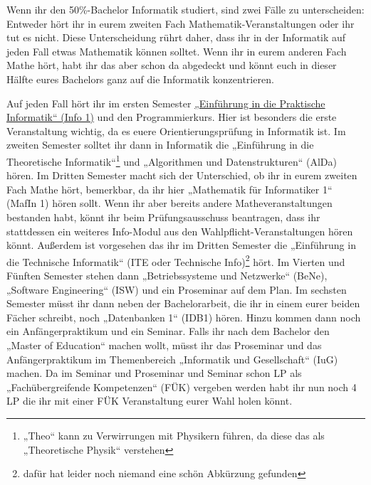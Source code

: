\newpage{}

Wenn ihr den 50\%-Bachelor Informatik studiert, sind zwei Fälle zu unterscheiden: Entweder hört ihr in eurem zweiten Fach Ma\-the\-ma\-tik-Ver\-an\-stal\-tun\-gen oder ihr tut es nicht. Diese Unterscheidung rührt daher, dass ihr in der Informatik auf jeden Fall etwas Mathematik können solltet. Wenn ihr in eurem anderen Fach Mathe hört, habt ihr das aber schon da abgedeckt und könnt euch in dieser Hälfte eures Bachelors ganz auf die Informatik konzentrieren.

Auf jeden Fall hört ihr im ersten Semester \hyperref[info1]{„Einführung in die Praktische Informatik“ (Info 1)} und den Programmierkurs. Hier ist besonders die erste Veranstaltung wichtig, da es euere Orientierungsprüfung in Informatik ist. Im zweiten Semester solltet ihr dann in Informatik die „Einführung in die Theoretische Informatik“\footnote{„Theo“ kann zu Verwirrungen mit Physikern führen, da diese das als „Theoretische Physik“ verstehen} und „Algorithmen und Datenstrukturen“ (AlDa) hören. Im Dritten Semester macht sich der Unterschied, ob ihr in eurem zweiten Fach Mathe hört, bemerkbar, da ihr hier „Mathematik für Informatiker 1“ (MafIn 1) hören sollt. Wenn ihr aber bereits andere Matheveranstaltungen bestanden habt, könnt ihr beim Prüfungsausschuss beantragen, dass ihr stattdessen ein weiteres Info-Modul aus den Wahlpflicht-Veranstaltungen hören könnt. Außerdem ist vorgesehen das ihr im Dritten Semester die „Einführung in die Technische Informatik“ (ITE oder Technische Info)\footnote{dafür hat leider noch niemand eine schön Abkürzung gefunden} hört. Im Vierten und Fünften Semester stehen dann „Betriebssysteme und Netzwerke“ (BeNe), „Software Engineering“ (ISW) und ein Proseminar auf dem Plan. Im sechsten Semester müsst ihr dann neben der Bachelorarbeit, die ihr in einem eurer beiden Fächer schreibt, noch „Datenbanken 1“ (IDB1) hören. Hinzu kommen dann noch ein Anfängerpraktikum und ein Seminar. Falls ihr nach dem Bachelor den „Master of Education“ machen wollt, müsst ihr das Proseminar und das Anfängerpraktikum im Themenbereich „Informatik und Gesellschaft“ (IuG) machen. Da im Seminar und Proseminar und Seminar schon \gls{LP} als „Fachübergreifende Kompetenzen“ (FÜK) vergeben werden habt ihr nun noch 4 \gls{LP} die ihr mit einer FÜK Veranstaltung eurer Wahl holen könnt.

